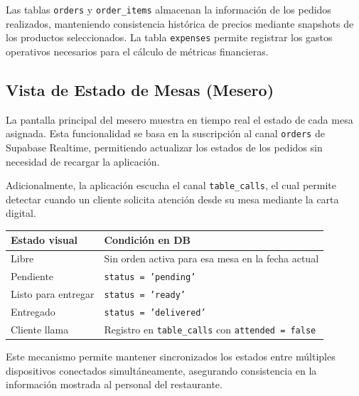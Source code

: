 Las tablas \texttt{orders} y \texttt{order\_items} almacenan la información de
los pedidos realizados, manteniendo consistencia histórica de precios mediante
snapshots de los productos seleccionados. La tabla \texttt{expenses} permite
registrar los gastos operativos necesarios para el cálculo de métricas financieras.

\subsection{Vista de Estado de Mesas (Mesero)}

La pantalla principal del mesero muestra en tiempo real el estado de cada
mesa asignada. Esta funcionalidad se basa en la suscripción al canal
\texttt{orders} de Supabase Realtime, permitiendo actualizar los estados
de los pedidos sin necesidad de recargar la aplicación.

Adicionalmente, la aplicación escucha el canal \texttt{table\_calls}, el cual
permite detectar cuando un cliente solicita atención desde su mesa mediante
la carta digital.

\begin{center}
\begin{tabular}{ll}
  \toprule
  \textbf{Estado visual} & \textbf{Condición en DB} \\
  \midrule
  Libre                  & Sin orden activa para esa mesa en la fecha actual \\
  Pendiente              & \texttt{status = 'pending'} \\
  Listo para entregar    & \texttt{status = 'ready'} \\
  Entregado              & \texttt{status = 'delivered'} \\
  Cliente llama          & Registro en \texttt{table\_calls} con \texttt{attended = false} \\
  \bottomrule
\end{tabular}
\end{center}

Este mecanismo permite mantener sincronizados los estados entre múltiples
dispositivos conectados simultáneamente, asegurando consistencia en la
información mostrada al personal del restaurante.